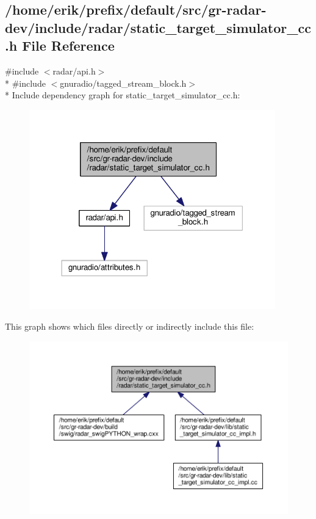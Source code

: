 \subsection{/home/erik/prefix/default/src/gr-\/radar-\/dev/include/radar/static\+\_\+target\+\_\+simulator\+\_\+cc.h File Reference}
\label{static__target__simulator__cc_8h}
{\ttfamily \#include $<$radar/api.\+h$>$}\\*
{\ttfamily \#include $<$gnuradio/tagged\+\_\+stream\+\_\+block.\+h$>$}\\*
Include dependency graph for static\+\_\+target\+\_\+simulator\+\_\+cc.\+h\+:
\nopagebreak
\begin{figure}[H]
\begin{center}
\leavevmode
\includegraphics[width=302pt]{d3/dd7/static__target__simulator__cc_8h__incl}
\end{center}
\end{figure}
This graph shows which files directly or indirectly include this file\+:
\nopagebreak
\begin{figure}[H]
\begin{center}
\leavevmode
\includegraphics[width=350pt]{d4/d8e/static__target__simulator__cc_8h__dep__incl}
\end{center}
\end{figure}

